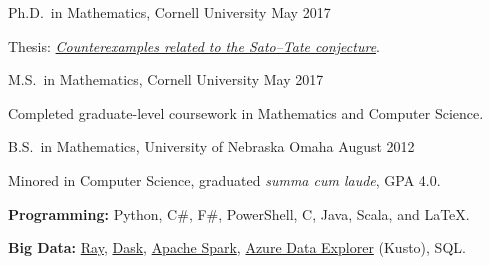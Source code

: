 \documentclass[11pt, letterpaper]{awesome-cv}
\begin{document}

\begin{cventries}

\cventry
  {Ph.D.~in Mathematics, Cornell University}
  {}{}
  {May 2017}
  {
    \begin{cvitems}
      \item{Thesis: \href{http://doi.org/10.7298/X4PN93Q3}{\emph{Counterexamples related to the Sato--Tate conjecture}}.}
    \end{cvitems}
  }
  
\cventry
  {M.S.~in Mathematics, Cornell University}
  {}{}
  {May 2017}
  {
    \begin{cvitems}
      \item{Completed graduate-level coursework in Mathematics and Computer Science.}
    \end{cvitems}
  }
  
\cventry
  {B.S.~in Mathematics, University of Nebraska Omaha}
  {}{}
  {August 2012}
  {
    \begin{cvitems}
      \item{Minored in Computer Science, graduated \emph{summa cum laude}, GPA 4.0.}
    \end{cvitems}
  }
  
\end{cventries}






\begin{cvparagraph}
\textbf{Programming:} Python, C\#, F\#, PowerShell, C, Java, Scala, and \LaTeX.

\textbf{Big Data:}
\href{https://www.ray.io/}{Ray},
\href{https://dask.org/}{Dask},
\href{https://spark.apache.org/}{Apache Spark},
\href{https://docs.microsoft.com/en-us/azure/kusto/query/index}{Azure Data Explorer} (Kusto),
SQL.
\end{cvparagraph}
\end{document}
